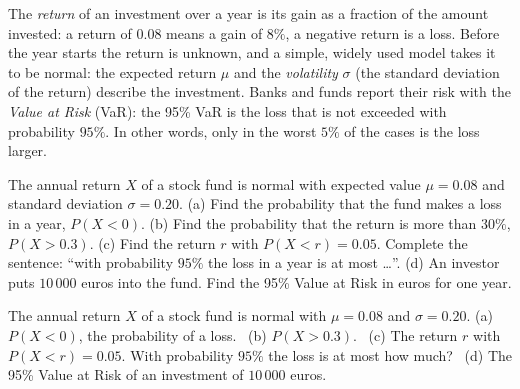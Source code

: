 
\begin{problem}
	\begin{context}
		The \emph{return} of an investment over a year is its gain as a
		fraction of the amount invested: a return of $0.08$ means a gain of
		$8\%$, a negative return is a loss. Before the year starts the return
		is unknown, and a simple, widely used model takes it to be normal: the
		expected return $\mu$ and the \emph{volatility} $\sigma$ (the standard
		deviation of the return) describe the investment. Banks and funds
		report their risk with the \emph{Value at Risk} (VaR): the 95\% VaR is
		the loss that is not exceeded with probability $95\%$. In other words,
		only in the worst $5\%$ of the cases is the loss larger.
	\end{context}
	The annual return $X$ of a stock fund is normal with expected value
	$\mu=0.08$ and standard deviation $\sigma=0.20$.
	(a) Find the probability that the fund makes a loss in a year, $P(X<0)$.
	(b) Find the probability that the return is more than $30\%$, $P(X>0.3)$.
	(c) Find the return $r$ with $P(X<r)=0.05$. Complete the sentence: ``with
	probability $95\%$ the loss in a year is at most \dots''.
	(d) An investor puts $10\,000$ euros into the fund. Find the 95\% Value at
	Risk in euros for one year.
\end{problem}

\begin{slideproblem}
	The annual return $X$ of a stock fund is normal with $\mu=0.08$ and
	$\sigma=0.20$.
	(a) $P(X<0)$, the probability of a loss.
	\ (b) $P(X>0.3)$.
	\ (c) The return $r$ with $P(X<r)=0.05$. With probability $95\%$ the
	loss is at most how much?
	\ (d) The 95\% Value at Risk of an investment of $10\,000$ euros.
\end{slideproblem}

